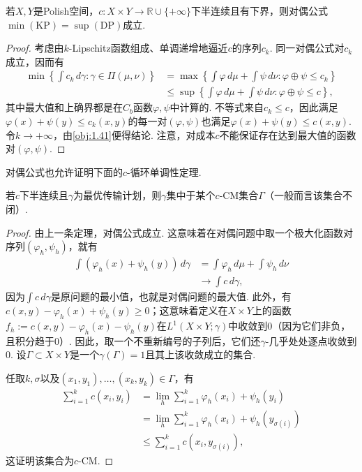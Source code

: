 \begin{theorem}\label{obj:1.42}
若$X,Y$是Polish空间，$c:X\times Y\to\mathbb R\cup\{+\infty\}$下半连续且有下界，则对偶公式$\min(\mathrm{KP})=\sup(\mathrm{DP})$成立.
\end{theorem}
\begin{proof}
考虑由$k$-Lipschitz函数组成、单调递增地逼近$c$的序列$c_k$. 同一对偶公式对$c_k$成立，因而有
\begin{equation*}
\begin{aligned}
\min\left\{\int c_k\,d\gamma:\gamma\in\Pi(\mu,\nu)\right\}
&=\max\left\{\int\varphi\,d\mu+\int\psi\,d\nu:\varphi\oplus\psi\le c_k\right\}\\
&\le\sup\left\{\int\varphi\,d\mu+\int\psi\,d\nu:\varphi\oplus\psi\le c\right\},
\end{aligned}
\end{equation*}
其中最大值和上确界都是在$C_b$函数$\varphi,\psi$中计算的. 不等式来自$c_k\le c$，因此满足$\varphi(x)+\psi(y)\le c_k(x,y)$的每一对$(\varphi,\psi)$也满足$\varphi(x)+\psi(y)\le c(x,y)$. 令$k\to+\infty$，由\autoref{obj:1.41}便得结论. 注意，对成本$c$不能保证存在达到最大值的函数对$(\varphi,\psi)$.
\end{proof}

对偶公式也允许证明下面的$c$-循环单调性定理.

\begin{theorem}\label{obj:1.43}
若$c$下半连续且$\gamma$为最优传输计划，则$\gamma$集中于某个$c$-CM集合$\Gamma$（一般而言该集合不闭）.
\end{theorem}
\begin{proof}
由上一条定理，对偶公式成立. 这意味着在对偶问题中取一个极大化函数对序列$(\varphi_h,\psi_h)$，就有
\begin{equation*}
\begin{aligned}
\int(\varphi_h(x)+\psi_h(y))\,d\gamma
&=\int\varphi_h\,d\mu+\int\psi_h\,d\nu\\
&\longrightarrow\int c\,d\gamma,
\end{aligned}
\end{equation*}
因为$\int c\,d\gamma$是原问题的最小值，也就是对偶问题的最大值. 此外，有$c(x,y)-\varphi_h(x)+\psi_h(y)\ge0$；这意味着定义在$X\times Y$上的函数$f_h:=c(x,y)-\varphi_h(x)-\psi_h(y)$在$L^1(X\times Y;\gamma)$中收敛到$0$（因为它们非负，且积分趋于$0$）. 因此，取一个不重新编号的子列后，它们还$\gamma$-几乎处处逐点收敛到$0$. 设$\Gamma\subset X\times Y$是一个$\gamma(\Gamma)=1$且其上该收敛成立的集合.

任取$k,\sigma$以及$(x_1,y_1),\ldots,(x_k,y_k)\in\Gamma$，有
\begin{equation*}
\begin{aligned}
\sum_{i=1}^k c(x_i,y_i)
&=\lim_h\sum_{i=1}^k\varphi_h(x_i)+\psi_h(y_i)\\
&=\lim_h\sum_{i=1}^k\varphi_h(x_i)+\psi_h(y_{\sigma(i)})\\
&\le\sum_{i=1}^k c(x_i,y_{\sigma(i)}),
\end{aligned}
\end{equation*}
这证明该集合为$c$-CM.
\end{proof}

